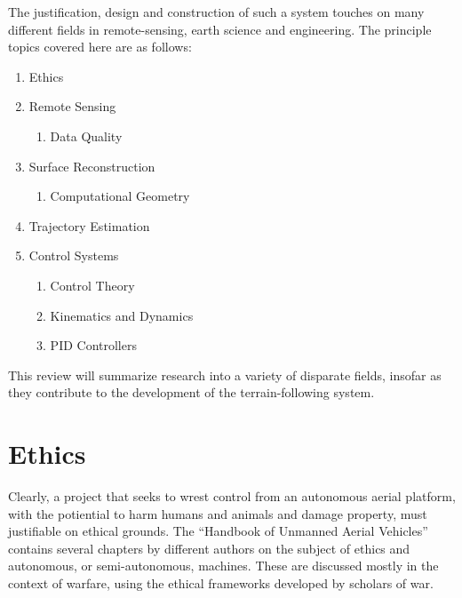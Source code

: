 \documentclass[10pt]{article}
\begin{document}
The justification, design and construction of such a system touches on many different fields in remote-sensing, earth science and engineering. The principle topics covered here are as follows:

\begin{enumerate}
\item Ethics
\item Remote Sensing
\begin{enumerate}
\item Data Quality
\end{enumerate}
\item Surface Reconstruction
	\begin{enumerate}
	\item Computational Geometry
	\end{enumerate}
\item Trajectory Estimation
\item Control Systems
	\begin{enumerate}
	\item Control Theory
	\item Kinematics and Dynamics
	\item PID Controllers
	\end{enumerate}
\end{enumerate}


This review will summarize research into a variety of disparate fields, insofar as they contribute to the development of the terrain-following system.


\section{Ethics}

Clearly, a project that seeks to wrest control from an autonomous aerial platform, with the potiential to harm humans and animals and damage property, must justifiable on ethical grounds. The ``Handbook of Unmanned Aerial Vehicles'' \cite{Valavanis2015j} contains several chapters by different authors on the subject of ethics and autonomous, or semi-autonomous, machines. These are discussed mostly in the context of warfare, using the ethical frameworks developed by scholars of war.
\end{document}
